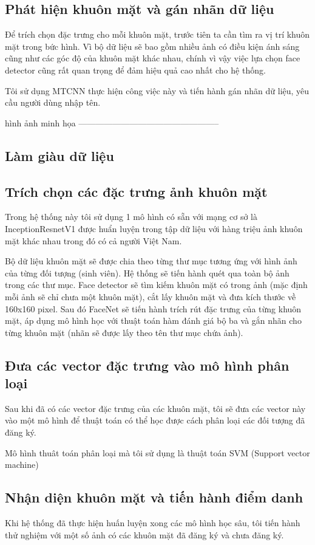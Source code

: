 \subsection{Phát hiện khuôn mặt và gán nhãn dữ liệu}
Để trích chọn đặc trưng cho mỗi khuôn mặt, trước tiên ta cần tìm ra
vị trí khuôn mặt trong bức hình. Vì bộ dữ liệu sẽ bao gồm nhiều ảnh
có điều kiện ánh sáng cũng như các góc độ của khuôn mặt khác nhau,
chính vì vậy việc lựa chọn face detector cũng rất quan trọng để đảm
hiệu quả cao nhất cho hệ thống.

Tôi sử dụng MTCNN thực hiện công việc này và tiến hành gán nhãn dữ liệu,
yêu cầu người dùng nhập tên.

hình ảnh minh họa --------------------------------------------------

\subsection{Làm giàu dữ liệu}

\subsection{Trích chọn các đặc trưng ảnh khuôn mặt}
Trong hệ thống này tôi sử dụng 1 mô hình có sẵn với mạng cơ sở là InceptionResnetV1 được
huẩn luyện trong tập dữ liệu với hàng triệu ảnh khuôn mặt khác nhau trong đó có cả người Việt Nam.

Bộ dữ liệu khuôn mặt sẽ được chia theo từng thư mục tương ứng với hình ảnh
của từng đối tượng (sinh viên). Hệ thống sẽ tiến hành quét qua toàn bộ ảnh
trong các thư mục. Face detector sẽ tìm kiếm khuôn mặt có
trong ảnh (mặc định mỗi ảnh sẽ chỉ chưa một khuôn mặt),
cắt lấy khuôn mặt và đưa kích thước về 160x160 pixel.
Sau đó FaceNet sẽ tiến hành trích rút đặc trưng của từng khuôn mặt,
áp dụng mô hình học với thuật toán hàm đánh giá bộ ba và gắn nhãn cho từng
khuôn mặt (nhãn sẽ được lấy theo tên thư mục chứa ảnh).

\subsection{Đưa các vector đặc trưng vào mô hình phân loại}
Sau khi đã có các vector đặc trưng của các khuôn mặt, tôi sẽ đưa các vector này
vào một mô hình để thuật toán có thể học được cách phân loại các đối tượng đã đăng ký.

Mô hình thuât toán phân loại mà tôi sử dụng là thuật toán SVM (Support vector machine)


\subsection{Nhận diện khuôn mặt và tiến hành điểm danh}
Khi hệ thống đã thực hiện huấn luyện xong các mô hình học sâu, tôi tiến hành thử nghiệm với một số ảnh có các khuôn mặt đã 
đăng ký và chưa đăng ký.

